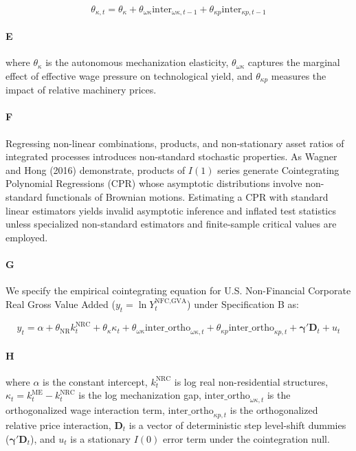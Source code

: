 \[\theta_{\kappa,t} = \theta_{\kappa} + \theta_{\omega\kappa} \text{inter}_{\omega\kappa, t-1} + \theta_{\kappa p} \text{inter}_{\kappa p, t-1}\]

\paragraph{E}
where $\theta_{\kappa}$ is the autonomous mechanization elasticity, $\theta_{\omega\kappa}$ captures the marginal effect of effective wage pressure on technological yield, and $\theta_{\kappa p}$ measures the impact of relative machinery prices.

\paragraph{F}
Regressing non-linear combinations, products, and non-stationary asset ratios of integrated processes introduces non-standard stochastic properties. As Wagner and Hong (2016) demonstrate, products of $I(1)$ series generate Cointegrating Polynomial Regressions (CPR) whose asymptotic distributions involve non-standard functionals of Brownian motions. Estimating a CPR with standard linear estimators yields invalid asymptotic inference and inflated test statistics unless specialized non-standard estimators and finite-sample critical values are employed.

\paragraph{G}
We specify the empirical cointegrating equation for U.S. Non-Financial Corporate Real Gross Value Added ($y_t = \ln Y_t^{\text{NFC,GVA}}$) under Specification B as:

\[y_t = \alpha + \theta_{\text{NR}} k_t^{\text{NRC}} + \theta_{\kappa} \kappa_t + \theta_{\omega\kappa} \text{inter\_ortho}_{\omega\kappa, t} + \theta_{\kappa p} \text{inter\_ortho}_{\kappa p, t} + \boldsymbol{\gamma}' \mathbf{D}_t + u_t\]

\paragraph{H}
where $\alpha$ is the constant intercept, $k_t^{\text{NRC}}$ is log real non-residential structures, $\kappa_t = k_t^{\text{ME}} - k_t^{\text{NRC}}$ is the log mechanization gap, $\text{inter\_ortho}_{\omega\kappa, t}$ is the orthogonalized wage interaction term, $\text{inter\_ortho}_{\kappa p, t}$ is the orthogonalized relative price interaction, $\mathbf{D}_t$ is a vector of deterministic step level-shift dummies ($\boldsymbol{\gamma}' \mathbf{D}_t$), and $u_t$ is a stationary $I(0)$ error term under the cointegration null.

